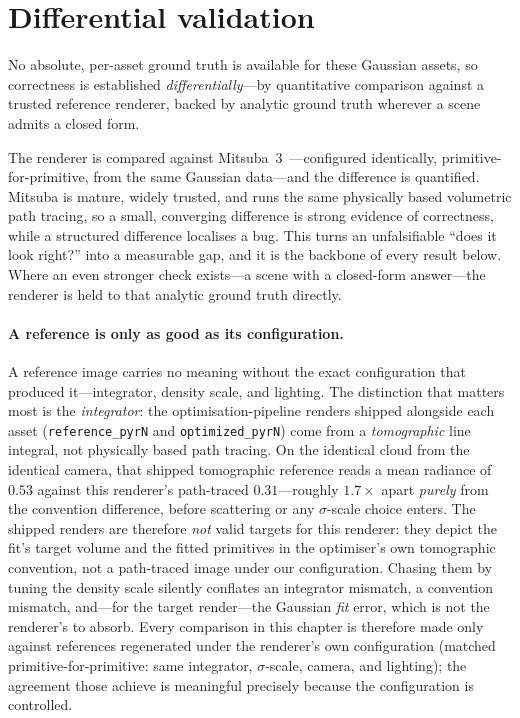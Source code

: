 \section{Differential validation}
\label{sec:reference-problem}

No absolute, per-asset ground truth is available for these Gaussian assets, so correctness is
established \emph{differentially}---by quantitative comparison against a trusted reference renderer,
backed by analytic ground truth wherever a scene admits a closed form.

The renderer is compared against Mitsuba~3~\cite{Mitsuba3}---configured identically,
primitive-for-primitive, from the same Gaussian data---and the difference is quantified. Mitsuba is
mature, widely trusted, and runs the same physically based volumetric path tracing, so a small,
converging difference is strong evidence of correctness, while a structured difference localises a
bug. This turns an unfalsifiable ``does it look right?'' into a measurable gap, and it is the backbone
of every result below. Where an even stronger check exists---a scene with a closed-form answer---the
renderer is held to that analytic ground truth directly.

\paragraph{A reference is only as good as its configuration.} A reference image carries no meaning
without the exact configuration that produced it---integrator, density scale, and lighting. The
distinction that matters most is the \emph{integrator}: the optimisation-pipeline renders shipped
alongside each asset (\texttt{reference\_pyrN} and \texttt{optimized\_pyrN}) come from a
\emph{tomographic} line integral, not physically based path tracing. On the identical cloud from the
identical camera, that shipped tomographic reference reads a mean radiance of $0.53$ against this
renderer's path-traced $0.31$---roughly $1.7\times$ apart \emph{purely} from the convention difference,
before scattering or any $\sigma$-scale choice enters. The shipped renders are therefore \emph{not}
valid targets for this renderer: they depict the fit's target volume and the fitted primitives in the
optimiser's own tomographic convention, not a path-traced image under our configuration. Chasing them by
tuning the density scale silently conflates an integrator mismatch, a convention mismatch, and---for the
target render---the Gaussian \emph{fit} error, which is not the renderer's to absorb. Every comparison in
this chapter is therefore made only against references regenerated under the renderer's own configuration
(matched primitive-for-primitive: same integrator, $\sigma$-scale, camera, and lighting); the agreement
those achieve is meaningful precisely because the configuration is controlled.

